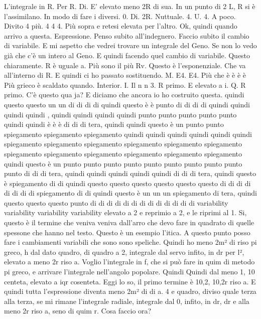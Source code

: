 \begin{soluzione}
   L'integrale in R. Per R. Di. E' elevato meno 2R di sua. In un punto di 2 L, R si è l'assimilano. In modo di fare i diversi. 0. Di. 2R. Nuttuale. 4. U. 4. A poco. Divito 4 più. 4 4 4. Più sopra e retesi elevata per l'altro. Ok, quindi quando arrivo a questa. Espressione. Penso subito all'indegnero. Faccio subito il cambio di variabile. E mi aspetto che vedrei trovare un integrale del Geno. Se non lo vedo già che c'è un intero al Geno. E quindi facendo quel cambio di variabile. Questo chiaramente. R è uguale a. Più sono il più Rv. Questo è l'esponenziale. Che va all'interno di R. E quindi ci ho passato sostituendo. M. E4. E4. Più che è è è è Più grieco è scaldato quando. Interior. I. Il n n 3. R primo. E elevato a i. Q. R primo. C'è questo qua ja? E diciamo che ancora io ho costruito questa. quindi questo questo un un di di di di quindi questo è è punto di di di di quindi quindi quindi quindi , quindi quindi quindi quindi punto punto punto punto punto quindi quindi è è è di di di tera, quindi quindi  questo è un punto punto spiegamento spiegamento spiegamento quindi quindi quindi quindi quindi quindi spiegamento spiegamento spiegamento spiegamento spiegamento spiegamento spiegamento spiegamento spiegamento spiegamento spiegamento spiegamento quindi questo è un punto punto punto punto punto punto punto punto punto punto di di di tera, quindi quindi quindi quindi quindi di di di tera, quindi questo è  spiegamento di di quindi questo questo questo questo questo questo di di di di di di di di spiegamento di di quindi questo è un un un spiegamento di tera, quindi questo questo questo punto di di di di di di di di di di di di di variability variability variability variability elevato a 2 e reprimio a 2, e le riprimi al 1. Si, questo è il termine che veniva veniva dall'arro che devo fare in quadrato di quelle spessone che hanno nel testo. Questo è un esempio l'itica. A questo punto posso fare i cambiamenti variabili che sono sono speliche. Quindi ho meno 2m² di riso pi greco, h dal dato quadro, di quadro a 2, integrale dal servo infito, in dr per l², elevato a meno 2r riso a. Voglio l'integrale in f, che si può fare in quim di metodo pi greco, e arrivare l'integrale nell'angolo popolare. Quindi Quindi dal meno 1, 10 centeta, elevato a iqr cosenteta. Eggi lo so, il primo termine è 10,2, 10,2r riso a. E quindi tutta l'espressione diventa meno 2m² di di a. 4 e quadro, diviso quale terza alla terza, se mi rimane l'integrale radiale, integrale dal 0, infito, in dr, dr e alla meno 2r riso a, seno di quim r. Cosa faccio ora? 
   

\end{soluzione}
